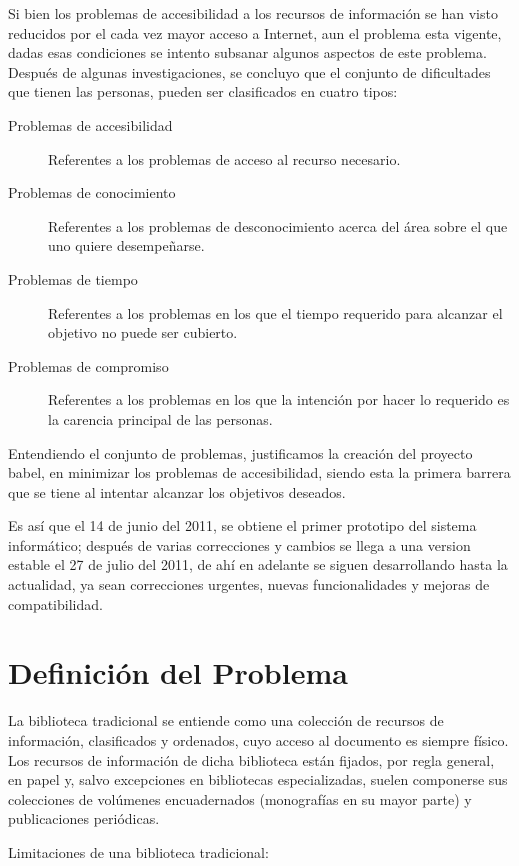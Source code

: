 \documentclass[letter,12pt]{article}
\begin{document}
Si bien los problemas de accesibilidad a los recursos de información se han visto reducidos por el
cada vez mayor acceso a Internet, aun el problema esta vigente, dadas esas condiciones se intento
subsanar algunos aspectos de este problema. Después de algunas investigaciones, se concluyo que el conjunto de dificultades que tienen las personas, pueden ser clasificados en cuatro tipos:

\begin{description}
\item [Problemas de accesibilidad] Referentes a los problemas de acceso al recurso necesario.
\item [Problemas de conocimiento] Referentes a los problemas de desconocimiento acerca del área 
sobre el que uno quiere desempeñarse.
\item [Problemas de tiempo] Referentes a los problemas en los que el tiempo requerido para alcanzar
el objetivo no puede ser cubierto.
\item [Problemas de compromiso] Referentes a los problemas en los que la intención por hacer lo
requerido es la carencia principal de las personas.
\end{description}

Entendiendo el conjunto de problemas, justificamos la creación del proyecto babel, en minimizar los
problemas de accesibilidad, siendo esta la primera barrera que se tiene al intentar alcanzar los
objetivos deseados.

Es así que el 14 de junio del 2011, se obtiene el primer prototipo del sistema informático; después
de varias correcciones y cambios se llega a una version estable el 27 de julio del 2011, de ahí en
adelante se siguen desarrollando hasta la actualidad, ya sean correcciones urgentes, nuevas
funcionalidades y mejoras de compatibilidad.

\section{Definición del Problema}
La biblioteca tradicional se entiende como una colección de recursos de información, clasificados
y ordenados, cuyo acceso al documento es siempre físico. Los recursos de información de dicha
biblioteca están fijados, por regla general, en papel y, salvo excepciones en bibliotecas
especializadas, suelen componerse sus colecciones de volúmenes encuadernados (monografías en su
mayor parte) y publicaciones periódicas.

Limitaciones de una biblioteca tradicional:
\end{document}
